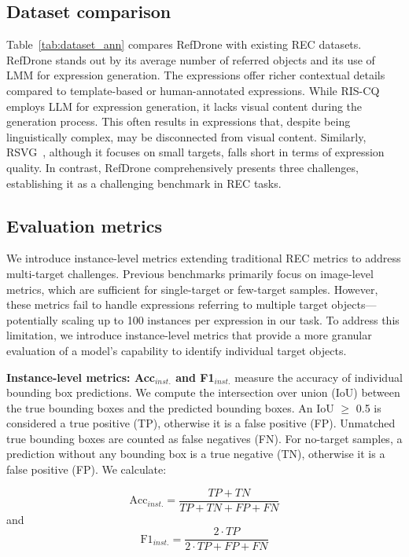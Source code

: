 \subsection{Dataset comparison}
Table~\ref{tab:dataset_ann} compares RefDrone with existing REC datasets. RefDrone stands out by its average number of referred objects and its use of LMM for expression generation. The expressions offer richer contextual details compared to template-based or human-annotated expressions. While RIS-CQ~\cite{riscq} employs LLM for expression generation, it lacks visual content during the generation process. This often results in expressions that, despite being linguistically complex, may be disconnected from visual content. Similarly, RSVG~\cite{zhan2023rsvg}, although it focuses on small targets, falls short in terms of expression quality. In contrast, RefDrone comprehensively presents three challenges, establishing it as a challenging benchmark in REC tasks.



\subsection{Evaluation metrics}
We introduce instance-level metrics extending traditional REC metrics to address multi-target challenges. Previous benchmarks primarily focus on image-level metrics, which are sufficient for single-target or few-target samples. However, these metrics fail to handle expressions referring to multiple target objects—potentially scaling up to 100 instances per expression in our task.  To address this limitation, we introduce instance-level metrics that provide a more granular evaluation of a model's capability to identify individual target objects.\par

\textbf{Instance-level metrics: Acc$_{inst.}$ and F1$_{inst.}$} measure the accuracy of individual bounding box predictions.
We compute the intersection over union (IoU) between the true bounding boxes and the predicted bounding boxes. An IoU $\geq$ 0.5 is considered a true positive (TP), otherwise it is a false positive (FP). Unmatched true bounding boxes are counted as false negatives (FN). For no-target samples, a prediction without any bounding box is a true negative (TN), otherwise it is a false positive (FP). We calculate:

\begin{equation}
\text{Acc}_{inst.} = \frac{TP + TN}{TP + TN + FP + FN}   \label{eq:important} 
\end{equation}
and
\begin{equation}
\text{F1}_{inst.} = \frac{2 \cdot TP}{2 \cdot TP + FP + FN}    \label{eq:also-important}
\end{equation}
\par


